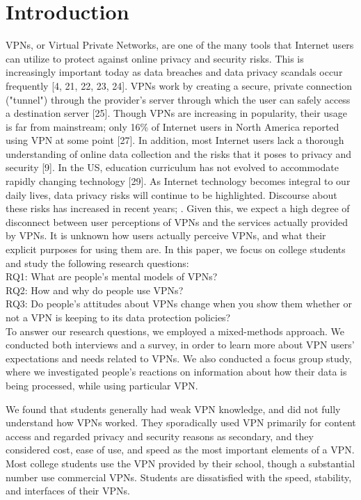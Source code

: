 \section{Introduction}

VPNs, or Virtual
Private Networks, are one of the many tools that Internet users can utilize to
protect against online privacy and security risks. This is increasingly important today as data breaches and data privacy scandals occur frequently [4, 21, 22, 23, 24]. VPNs work by creating a
secure, private connection ("tunnel") through the provider's server through
which the user can safely access a destination server [25]. Though VPNs are
increasing in popularity, their usage is far from mainstream; only 16\% of
Internet users in North America reported using VPN at some point [27]. In
addition, most Internet users lack a thorough understanding of online data
collection and the risks that it poses to privacy and security [9]. In the US,
education curriculum has not evolved to accommodate rapidly changing
technology [29]. As Internet technology becomes integral to our daily lives, data privacy risks
will continue to be highlighted. Discourse about these risks has increased in
recent years; . Given this, we expect a high degree of disconnect between
user perceptions of VPNs and the services actually provided by VPNs. It is
unknown how users actually perceive VPNs, and what their explicit purposes for
using them are. In this paper, we focus on college students and study the
following research questions:\\
RQ1: What are people’s mental models of VPNs?\\
RQ2: How and why do people use VPNs?\\
RQ3: Do people’s attitudes about VPNs change when you show them whether or not a VPN is keeping to its data protection policies?\\

To answer our research questions, we employed a mixed-methods approach. We conducted both interviews and a survey, in order to learn more about VPN users' expectations and needs related to VPNs. We also conducted a focus group study, where we investigated people's reactions on information about how their data is being processed, while using particular VPN.

We found that students generally had weak VPN knowledge, and did not fully
understand how VPNs worked. They sporadically used VPN primarily for content
access and regarded privacy and security reasons as secondary, and they
considered cost, ease of use, and speed as the most important elements of a
VPN. Most college students use the VPN provided by their school, though a
substantial number use commercial VPNs. Students are dissatisfied with the
speed, stability, and interfaces of their VPNs.

